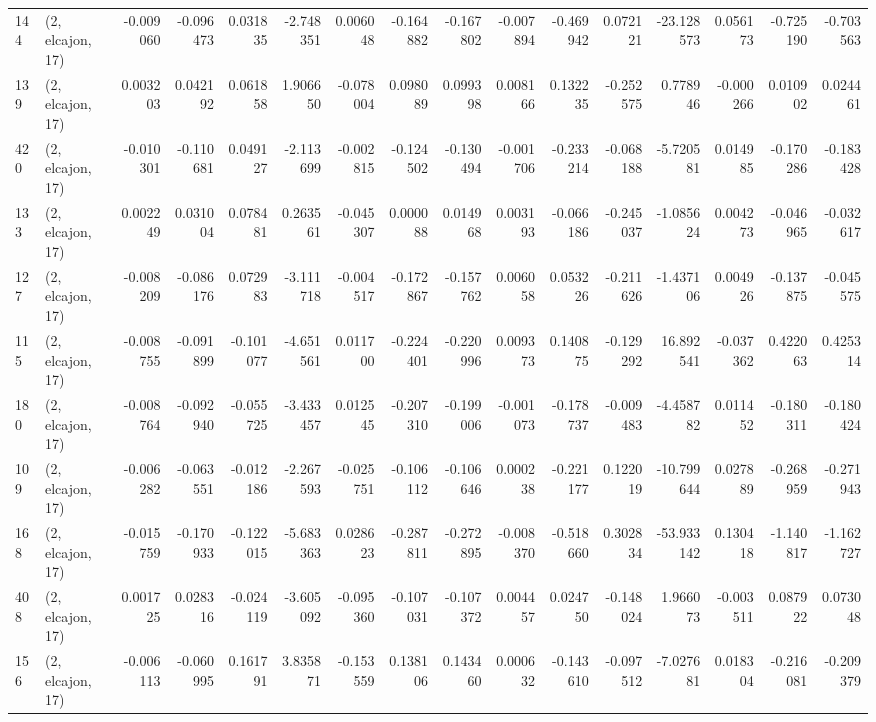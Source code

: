 \begin{tabular}{llrrrrrrrrrrrrrr}
144 &  (2, elcajon, 17) &  -0.009060 & -0.096473 &  0.031835 &   -2.748351 &  0.006048 &  -0.164882 & -0.167802 & -0.007894 & -0.469942 &  0.072121 &  -23.128573 &  0.056173 & -0.725190 & -0.703563 \\
139 &  (2, elcajon, 17) &   0.003203 &  0.042192 &  0.061858 &    1.906650 & -0.078004 &   0.098089 &  0.099398 &  0.008166 &  0.132235 & -0.252575 &    0.778946 & -0.000266 &  0.010902 &  0.024461 \\
420 &  (2, elcajon, 17) &  -0.010301 & -0.110681 &  0.049127 &   -2.113699 & -0.002815 &  -0.124502 & -0.130494 & -0.001706 & -0.233214 & -0.068188 &   -5.720581 &  0.014985 & -0.170286 & -0.183428 \\
133 &  (2, elcajon, 17) &   0.002249 &  0.031004 &  0.078481 &    0.263561 & -0.045307 &   0.000088 &  0.014968 &  0.003193 & -0.066186 & -0.245037 &   -1.085624 &  0.004273 & -0.046965 & -0.032617 \\
127 &  (2, elcajon, 17) &  -0.008209 & -0.086176 &  0.072983 &   -3.111718 & -0.004517 &  -0.172867 & -0.157762 &  0.006058 &  0.053226 & -0.211626 &   -1.437106 &  0.004926 & -0.137875 & -0.045575 \\
115 &  (2, elcajon, 17) &  -0.008755 & -0.091899 & -0.101077 &   -4.651561 &  0.011700 &  -0.224401 & -0.220996 &  0.009373 &  0.140875 & -0.129292 &   16.892541 & -0.037362 &  0.422063 &  0.425314 \\
180 &  (2, elcajon, 17) &  -0.008764 & -0.092940 & -0.055725 &   -3.433457 &  0.012545 &  -0.207310 & -0.199006 & -0.001073 & -0.178737 & -0.009483 &   -4.458782 &  0.011452 & -0.180311 & -0.180424 \\
109 &  (2, elcajon, 17) &  -0.006282 & -0.063551 & -0.012186 &   -2.267593 & -0.025751 &  -0.106112 & -0.106646 &  0.000238 & -0.221177 &  0.122019 &  -10.799644 &  0.027889 & -0.268959 & -0.271943 \\
168 &  (2, elcajon, 17) &  -0.015759 & -0.170933 & -0.122015 &   -5.683363 &  0.028623 &  -0.287811 & -0.272895 & -0.008370 & -0.518660 &  0.302834 &  -53.933142 &  0.130418 & -1.140817 & -1.162727 \\
408 &  (2, elcajon, 17) &   0.001725 &  0.028316 & -0.024119 &   -3.605092 & -0.095360 &  -0.107031 & -0.107372 &  0.004457 &  0.024750 & -0.148024 &    1.966073 & -0.003511 &  0.087922 &  0.073048 \\
156 &  (2, elcajon, 17) &  -0.006113 & -0.060995 &  0.161791 &    3.835871 & -0.153559 &   0.138106 &  0.143460 &  0.000632 & -0.143610 & -0.097512 &   -7.027681 &  0.018304 & -0.216081 & -0.209379 \\

\end{tabular}
